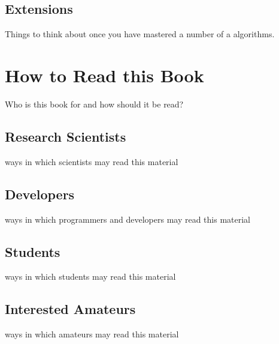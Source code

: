 \subsection{Extensions}
Things to think about once you have mastered a number of a algorithms.



\section{How to Read this Book}
Who is this book for and how should it be read?


\subsection{Research Scientists}
ways in which scientists may read this material

\subsection{Developers}
ways in which programmers and developers may read this material

\subsection{Students}
ways in which students may read this material

\subsection{Interested Amateurs}
ways in which amateurs may read this material

